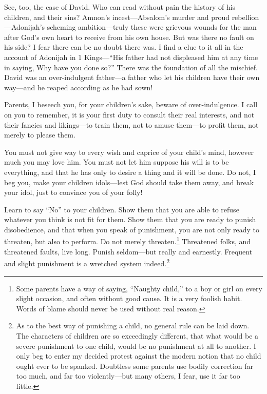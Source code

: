 \documentclass[
]{book}
\begin{document}
See, too, the case of David. Who can read without pain the history of his children, and their sins? Amnon's incest---Absalom's murder and proud rebellion---Adonijah's scheming ambition---truly these were grievous wounds for the man after God's own heart to receive from his own house. But was there no fault on his side? I fear there can be no doubt there was. I find a clue to it all in the account of Adonijah in 1 Kings---``His father had not displeased him at any time in saying, Why have you done so?'' There was the foundation of all the mischief. David was an over-indulgent father---a father who let his children have their own way---and he reaped according as he had sown!

Parents, I beseech you, for your children's sake, beware of over-indulgence. I call on you to remember, it is your first duty to consult their real interests, and not their fancies and likings---to train them, not to amuse them---to profit them, not merely to please them.

You must not give way to every wish and caprice of your child's mind, however much you may love him. You must not let him suppose his will is to be everything, and that he has only to desire a thing and it will be done. Do not, I beg you, make your children idols---lest God should take them away, and break your idol, just to convince you of your folly!

Learn to say ``No'' to your children. Show them that you are able to refuse whatever you think is not fit for them. Show them that you are ready to punish disobedience, and that when you speak of punishment, you are not only ready to threaten, but also to perform. Do not merely threaten.\footnote{Some parents have a way of saying, ``Naughty child,'' to a boy or girl on every slight occasion, and often without good cause. It is a very foolish habit. Words of blame should never be used without real reason.} Threatened folks, and threatened faults, live long. Punish seldom---but really and earnestly. Frequent and slight punishment is a wretched system indeed.\footnote{As to the best way of punishing a child, no general rule can be laid down. The characters of children are so exceedingly different, that what would be a severe punishment to one child, would be no punishment at all to another. I only beg to enter my decided protest against the modern notion that no child ought ever to be spanked. Doubtless some parents use bodily correction far too much, and far too violently---but many others, I fear, use it far too little.}
\end{document}
